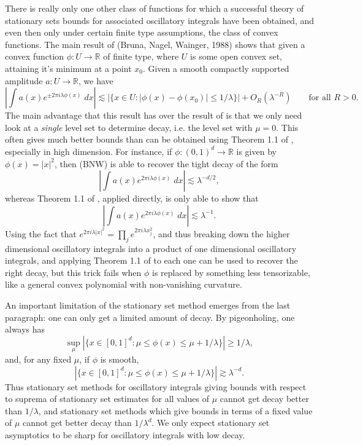 \documentclass[12pt]{article}
\newcommand{\R}{\mathbb{R}}
\theoremstyle{definition}
\theoremstyle{remark}
\numberwithin{equation}{section}
\begin{document}
There is really only one other class of functions for which a successful theory of stationary sets bounds for associated oscillatory integrals have been obtained, and even then only under certain finite type assumptions, the class of convex functions. The main result of (Bruna, Nagel, Wainger, 1988) shows that given a convex function $\phi: U \to \R$ of finite type, where $U$ is some open convex set, attaining it's minimum at a point $x_0$. Given a smooth compactly supported amplitude $a: U \to \R$, we have
%
\[ \left| \int a(x) e^{\pm 2 \pi i \lambda \phi(x)}\; dx \right| \lesssim |\{ x \in U : |\phi(x) - \phi(x_0)| \leq 1 / \lambda \}| + O_R(\lambda^{-R}) \quad\quad\text{for all $R > 0$}. \]
%
The main advantage that this result has over the result of \cite{BGZZ} is that we only need look at a \emph{single} level set to determine decay, i.e. the level set with $\mu = 0$. This often gives much better bounds than can be obtained using Theorem 1.1 of \cite{BGZZ}, especially in high dimension. For instance, if $\phi: (0,1)^d \to \R$ is given by $\phi(x) = |x|^2$, then (BNW) is able to recover the tight decay of the form
%
\[ \left| \int a(x) e^{2\pi i \lambda \phi(x)}\; dx \right| \lesssim \lambda^{-d/2}, \]
%
whereas Theorem 1.1 of \cite{BGZZ}, applied directly, is only able to show that
%
\[ \left| \int a(x) e^{2 \pi i \lambda \phi(x)}\; dx \right| \lesssim \lambda^{-1}. \]
%
Using the fact that $e^{2 \pi i \lambda |x|^2} = \prod_j e^{2 \pi i \lambda x_j^2}$, and thus breaking down the higher dimensional oscillatory integrals into a product of one dimensional oscillatory integrals, and applying Theorem 1.1 of \cite{BGZZ} to each one can be used to recover the right decay, but this trick fails when $\phi$ is replaced by something less tensorizable, like a general convex polynomial with non-vanishing curvature.

An important limitation of the stationary set method emerges from the last paragraph: one can only get a limited amount of decay. By pigeonholing, one always has
%
\[ \sup_\mu |\{ x \in [0,1]^d : \mu \leq \phi(x) \leq \mu + 1/\lambda \}| \geq 1/\lambda, \]
%
and, for any fixed $\mu$, if $\phi$ is smooth,
%
\[ |\{ x \in [0,1]^d : \mu \leq \phi(x) \leq \mu + 1/\lambda \}| \gtrsim \lambda^{-d}. \]
%
Thus stationary set methods for oscillatory integrals giving bounds with respect to suprema of stationary set estimates for all values of $\mu$ cannot get decay better than $1/\lambda$, and stationary set methods which give bounds in terms of a fixed value of $\mu$ cannot get better decay than $1/\lambda^d$. We only expect stationary set asymptotics to be sharp for oscillatory integrals with low decay.
\end{document}
